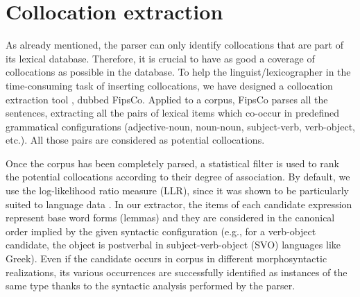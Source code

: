 \documentclass[output=paper]{langsci/langscibook}
\begin{document}
\section{Collocation extraction}
\label{fou:sec5}
As already mentioned, the parser can only identify collocations that are part of its lexical database. Therefore, it is crucial to have as good a coverage of collocations as possible in the database. To help the linguist/lexicographer in the time-consuming task of inserting collocations, we have designed a collocation  extraction tool \citep{seretan11}, dubbed FipsCo. Applied to a corpus, FipsCo parses all the sentences, extracting all the pairs of lexical items which co-occur in predefined grammatical configurations (adjective-noun, noun-noun, subject-verb, verb-object, etc.). All those pairs are considered as potential collocations.

Once the corpus has been completely parsed, a statistical filter  is used to rank the potential collocations according to their degree of association. By default, we use the log-likelihood ratio measure (LLR), since it was shown to be particularly suited to language data \citep{dunning93}. In our extractor, the items of each candidate expression represent base word forms (lemmas) and they are considered in the canonical order implied by the given syntactic configuration (e.g., for a verb-object candidate, the object is postverbal in subject-verb-object (SVO) languages like Greek). Even if the candidate occurs in corpus in different morphosyntactic realizations, its various occurrences are successfully identified as instances of the same type thanks to the syntactic analysis performed by the parser. 
\end{document}

